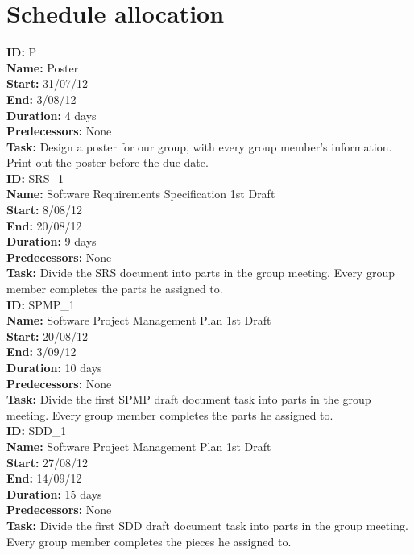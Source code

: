 \documentclass[11pt, a4paper]{report}
\begin{document}
\section{Schedule allocation}

\noindent \textbf{ID:} P \\
\noindent \textbf{Name:} Poster \\
\noindent \textbf{Start:} 31/07/12 \\
\noindent \textbf{End:} 3/08/12 \\
\noindent \textbf{Duration:} 4 days \\
\noindent \textbf{Predecessors:} None \\
\noindent \textbf{Task:}  Design a poster for our group, with every group member's information. Print out the poster before the due date.\\[0.5cm]

\noindent \textbf{ID:} SRS_1 \\
\noindent \textbf{Name:} Software Requirements Specification 1st Draft\\
\noindent \textbf{Start:} 8/08/12 \\
\noindent \textbf{End:} 20/08/12 \\
\noindent \textbf{Duration:} 9 days \\
\noindent \textbf{Predecessors:} None \\
\noindent \textbf{Task:} Divide the SRS document into parts in the group meeting. Every group member completes the parts he assigned to.\\[0.5cm]

\noindent \textbf{ID:} SPMP_1 \\
\noindent \textbf{Name:} Software Project Management Plan 1st Draft\\
\noindent \textbf{Start:} 20/08/12 \\
\noindent \textbf{End:} 3/09/12 \\
\noindent \textbf{Duration:} 10 days \\
\noindent \textbf{Predecessors:} None \\
\noindent \textbf{Task:} Divide the first SPMP draft document task into parts in the group meeting. Every group member completes the parts he assigned to.\\[0.5cm]

\noindent \textbf{ID:} SDD_1 \\
\noindent \textbf{Name:} Software Project Management Plan 1st Draft\\
\noindent \textbf{Start:} 27/08/12 \\
\noindent \textbf{End:} 14/09/12 \\
\noindent \textbf{Duration:} 15 days \\
\noindent \textbf{Predecessors:} None \\
\noindent \textbf{Task:} Divide the first SDD draft document task into parts in the group meeting. Every group member completes the pieces he assigned to.\\[0.5cm]
\end{document}
